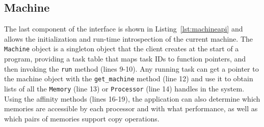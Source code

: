 



\subsection{Machine}
\label{subsec:machmodel}
The last component of the interface is shown in Listing~\ref{lst:machineapi} and allows the
initialization and run-time introspection
of the current machine.
The {\tt Machine} object is a singleton object that the client creates at the start of a
program, providing a task table that maps task IDs to function pointers,
and then invoking the {\tt run} method (lines 9-10).
Any running task can get a pointer to the machine object with the
{\tt get\_machine} method (line 12) and use it to obtain lists of all the {\tt Memory} (line 13) or 
{\tt Processor} (line 14) handles in the system.  Using the affinity methods (lines 16-19),
the application can also determine which memories are accessible by each
processor and with what performance, as well as which pairs of memories support copy operations.



